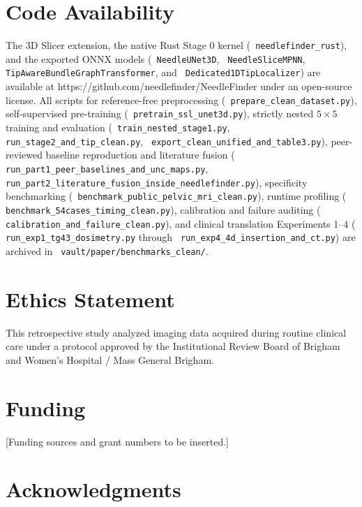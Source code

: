 \documentclass[
  11pt,
]{article}
\let\nforigtexttt\texttt
\renewcommand{\texttt}[1]{\nforigtexttt{\XeTeXinterchartokenstate=1 #1}}
\begin{document}
\section*{Code Availability}\label{code-availability}

The 3D Slicer extension, the native Rust Stage 0 kernel
(\texttt{needlefinder\_rust}), and the exported ONNX models
(\texttt{NeedleUNet3D}, \texttt{NeedleSliceMPNN},
\texttt{TipAwareBundleGraphTransformer}, and
\texttt{Dedicated1DTipLocalizer}) are available at
https://github.com/needlefinder/NeedleFinder under an open-source
license. All scripts for reference-free preprocessing
(\texttt{prepare\_clean\_dataset.py}), self-supervised pre-training
(\texttt{pretrain\_ssl\_unet3d.py}), strictly nested \(5 \times 5\)
training and evaluation (\texttt{train\_nested\_stage1.py},
\texttt{run\_stage2\_and\_tip\_clean.py},
\texttt{export\_clean\_unified\_and\_table3.py}), peer-reviewed baseline
reproduction and literature fusion
(\texttt{run\_part1\_peer\_baselines\_and\_unc\_maps.py},
\texttt{run\_part2\_literature\_fusion\_inside\_needlefinder.py}),
specificity benchmarking
(\texttt{benchmark\_public\_pelvic\_mri\_clean.py}), runtime profiling
(\texttt{benchmark\_54cases\_timing\_clean.py}), calibration and failure
auditing (\texttt{calibration\_and\_failure\_clean.py}), and clinical
translation Experiments 1--4 (\texttt{run\_exp1\_tg43\_dosimetry.py}
through \texttt{run\_exp4\_4d\_insertion\_and\_ct.py}) are archived in
\texttt{vault/paper/benchmarks\_clean/}.

\section*{Ethics Statement}\label{ethics-statement}

This retrospective study analyzed imaging data acquired during routine
clinical care under a protocol approved by the Institutional Review
Board of Brigham and Women's Hospital / Mass General Brigham.

\section*{Funding}\label{funding}

{[}Funding sources and grant numbers to be inserted.{]}

\section*{Acknowledgments}\label{acknowledgments}
\end{document}
